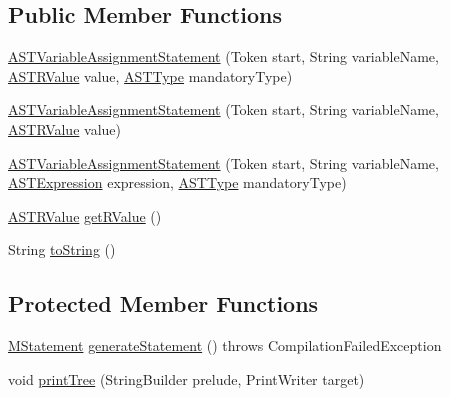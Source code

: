 \subsection*{Public Member Functions}
\begin{DoxyCompactItemize}
\item 
\hyperlink{classorg_1_1tzi_1_1use_1_1parser_1_1soil_1_1ast_1_1_a_s_t_variable_assignment_statement_a2dd295a3c9a826c2be20930e11dccf22}{A\-S\-T\-Variable\-Assignment\-Statement} (Token start, String variable\-Name, \hyperlink{classorg_1_1tzi_1_1use_1_1parser_1_1soil_1_1ast_1_1_a_s_t_r_value}{A\-S\-T\-R\-Value} value, \hyperlink{classorg_1_1tzi_1_1use_1_1parser_1_1ocl_1_1_a_s_t_type}{A\-S\-T\-Type} mandatory\-Type)
\item 
\hyperlink{classorg_1_1tzi_1_1use_1_1parser_1_1soil_1_1ast_1_1_a_s_t_variable_assignment_statement_a932125df3e12d62b9940e375b98ecfb5}{A\-S\-T\-Variable\-Assignment\-Statement} (Token start, String variable\-Name, \hyperlink{classorg_1_1tzi_1_1use_1_1parser_1_1soil_1_1ast_1_1_a_s_t_r_value}{A\-S\-T\-R\-Value} value)
\item 
\hyperlink{classorg_1_1tzi_1_1use_1_1parser_1_1soil_1_1ast_1_1_a_s_t_variable_assignment_statement_a28d31363c138ebf58adb7f4edc92f364}{A\-S\-T\-Variable\-Assignment\-Statement} (Token start, String variable\-Name, \hyperlink{classorg_1_1tzi_1_1use_1_1parser_1_1ocl_1_1_a_s_t_expression}{A\-S\-T\-Expression} expression, \hyperlink{classorg_1_1tzi_1_1use_1_1parser_1_1ocl_1_1_a_s_t_type}{A\-S\-T\-Type} mandatory\-Type)
\item 
\hyperlink{classorg_1_1tzi_1_1use_1_1parser_1_1soil_1_1ast_1_1_a_s_t_r_value}{A\-S\-T\-R\-Value} \hyperlink{classorg_1_1tzi_1_1use_1_1parser_1_1soil_1_1ast_1_1_a_s_t_variable_assignment_statement_adb3af7dd5954d1b224646ea4ddee7f1e}{get\-R\-Value} ()
\item 
String \hyperlink{classorg_1_1tzi_1_1use_1_1parser_1_1soil_1_1ast_1_1_a_s_t_variable_assignment_statement_acdcc1af7aa3055ce7973840e7ff59da3}{to\-String} ()
\end{DoxyCompactItemize}
\subsection*{Protected Member Functions}
\begin{DoxyCompactItemize}
\item 
\hyperlink{classorg_1_1tzi_1_1use_1_1uml_1_1sys_1_1soil_1_1_m_statement}{M\-Statement} \hyperlink{classorg_1_1tzi_1_1use_1_1parser_1_1soil_1_1ast_1_1_a_s_t_variable_assignment_statement_aadd319291031d1d06f9f6f8487f16fac}{generate\-Statement} ()  throws Compilation\-Failed\-Exception 
\item 
void \hyperlink{classorg_1_1tzi_1_1use_1_1parser_1_1soil_1_1ast_1_1_a_s_t_variable_assignment_statement_a0cce53e9d728d8aa2ced5bf7906a5b50}{print\-Tree} (String\-Builder prelude, Print\-Writer target)
\end{DoxyCompactItemize}
